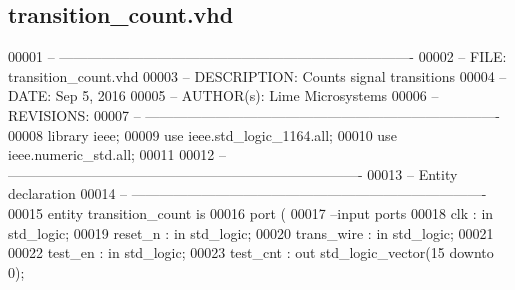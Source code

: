 \subsection{transition\+\_\+count.\+vhd}
\label{transition__count_8vhd_source}

\begin{DoxyCode}
00001 \textcolor{keyword}{-- ---------------------------------------------------------------------------- }
00002 \textcolor{keyword}{-- FILE:    transition\_count.vhd}
00003 \textcolor{keyword}{-- DESCRIPTION: Counts signal transitions}
00004 \textcolor{keyword}{-- DATE:    Sep 5, 2016}
00005 \textcolor{keyword}{-- AUTHOR(s):   Lime Microsystems}
00006 \textcolor{keyword}{-- REVISIONS:}
00007 \textcolor{keyword}{-- ---------------------------------------------------------------------------- }
00008 \textcolor{vhdlkeyword}{library }\textcolor{keywordflow}{ieee};
00009 \textcolor{vhdlkeyword}{use }ieee.std\_logic\_1164.\textcolor{keywordflow}{all};
00010 \textcolor{vhdlkeyword}{use }ieee.numeric\_std.\textcolor{keywordflow}{all};
00011 
00012 \textcolor{keyword}{-- ----------------------------------------------------------------------------}
00013 \textcolor{keyword}{-- Entity declaration}
00014 \textcolor{keyword}{-- ----------------------------------------------------------------------------}
00015 \textcolor{keywordflow}{entity }transition_count \textcolor{keywordflow}{is}
00016   \textcolor{keywordflow}{port} \textcolor{vhdlchar}{(}
00017 \textcolor{keyword}{        --input ports }
00018             \textcolor{vhdlchar}{clk}             \textcolor{vhdlchar}{:} \textcolor{keywordflow}{in} \textcolor{comment}{std\_logic};
00019             \textcolor{vhdlchar}{reset_n}         \textcolor{vhdlchar}{:} \textcolor{keywordflow}{in} \textcolor{comment}{std\_logic};
00020             \textcolor{vhdlchar}{trans_wire}      \textcolor{vhdlchar}{:} \textcolor{keywordflow}{in} \textcolor{comment}{std\_logic};
00021           
00022             \textcolor{vhdlchar}{test_en}         \textcolor{vhdlchar}{:} \textcolor{keywordflow}{in} \textcolor{comment}{std\_logic};
00023             \textcolor{vhdlchar}{test_cnt}            \textcolor{vhdlchar}{:} \textcolor{keywordflow}{out} \textcolor{comment}{std\_logic\_vector}\textcolor{vhdlchar}{(}\textcolor{vhdllogic}{}\textcolor{vhdllogic}{15} \textcolor{keywordflow}{downto} \textcolor{vhdllogic}{}\textcolor{vhdllogic}{0}\textcolor{vhdlchar}{)};

\end{DoxyCode}
